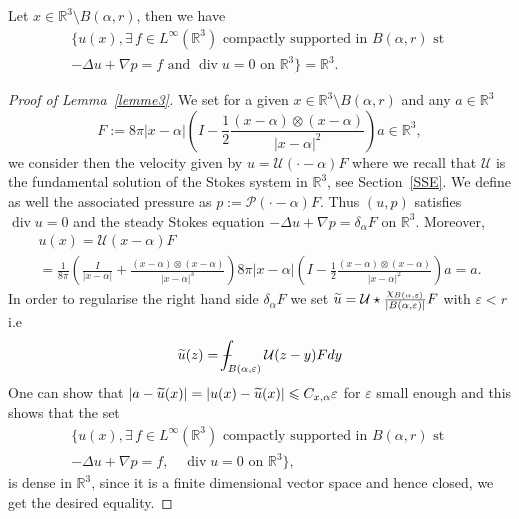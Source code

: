 \documentclass[AHL,Unicode,longabstracts,published]{cedram}
\newcommand{\R}{\mathbb{R}}
\newcommand{\clP}{\mathcal{P}}
\newcommand{\clU}{\mathcal{U}}
\renewcommand{\leq}{\leqslant}
\renewcommand{\div}{\operatorname{div}}
\newcommand*\Xint[1]{\mathchoice {\XXint\displaystyle\textstyle{#1}} {\XXint\textstyle\scriptstyle{#1}} {\XXint\scriptstyle\scriptscriptstyle{#1}} {\XXint\scriptscriptstyle\scriptscriptstyle{#1}}
\!\int}
\newcommand*\XXint[3]{{\setbox0=\hbox{$#1{#2#3}{\int}$ }\vcenter{\hbox{$#2#3$ }}\kern-.6\wd0}}
\newcommand*\dashint{\Xint-}
\let\oldtilde\tilde
\renewcommand*{\tilde}[1]{\mathchoice{\widetilde{#1}}{\widetilde{#1}}{\oldtilde{#1}}{\oldtilde{#1}}}
\let\oldexists\exists
\renewcommand*{\exists}{\mathrel{\oldexists}}
\begin{document}
\begin{lemm}\label{lemme3}
Let $ x \in \R^3 \setminus B(\alpha,r)$, then we have
\begin{multline*}
\Big \{ u(x),\exists \, f\in L^\infty\left(\R^3\right) \text{ compactly supported in } B(\alpha,r) \text{ st } \\ -\Delta u+\nabla p =f \text{ and } \div u= 0 \text{ on } \R^3 \Big \}=\R^3.
\end{multline*}
\end{lemm}
\begin{proof}[Proof of Lemma~\ref{lemme3}]
We set for a given $x \in \R^3 \setminus B(\alpha,r)$ and any $a \in \R^3$
\[
F:=8\pi|x-\alpha | \left(I-\frac{1}{2}\frac{(x-\alpha) \otimes (x-\alpha)}{|x-\alpha|^2} \right)a \in \R^3,
\]
we consider then the velocity given by $u=\clU(\cdot-\alpha)F$ where we recall that $\clU $ is the fundamental solution of the Stokes system in $\R^3$, see Section~\ref{SSE}. We define as well the associated pressure as $p:=\clP(\cdot-\alpha)F $. Thus $(u,p)$ satisfies $\div u= 0 $ and the steady Stokes equation $-\Delta u+\nabla p =\delta_\alpha F $ on $\R^3$. Moreover,
\begin{multline*}
u(x) = \clU (x-\alpha) F
\\ =\frac{1}{8\pi} \left(\frac{I}{|x-\alpha|}+\frac{(x-\alpha) \otimes (x-\alpha)}{|x-\alpha|^3} \right) 8\pi|x-\alpha| \left(I-\frac{1}{2}\frac{(x-\alpha) \otimes (x-\alpha)}{|x-\alpha|^2} \right)a = a.
\end{multline*}
In order to regularise the right hand side $\delta_{\alpha}F$ we set $\tilde{u} =\clU \star \frac{\chi_{B(\alpha,\varepsilon)}}{|B(\alpha,\varepsilon)|}F$ with $\varepsilon<r$ i.e
\[
\tilde{u}(z)= \dashint_{B(\alpha,\varepsilon)}\clU(z-y)F dy
\]
One can show that $ |a-\tilde{u}(x)|=|u(x)-\tilde{u}(x)|\leq C_{x,\alpha} \varepsilon$ for $\varepsilon$ small enough and this shows that the set
\begin{multline*}
\Big \{ u(x),\exists \, f\in L^\infty\left(\R^3\right) \text{ compactly supported in } B(\alpha,r) \text{ st } \\ -\Delta u+\nabla p =f, \quad \div u= 0 \text{ on } \R^3 \Big \},
\end{multline*}
is dense in $\R^3$, since it is a finite dimensional vector space and hence closed, we get the desired equality.
\end{proof}
\end{document}
